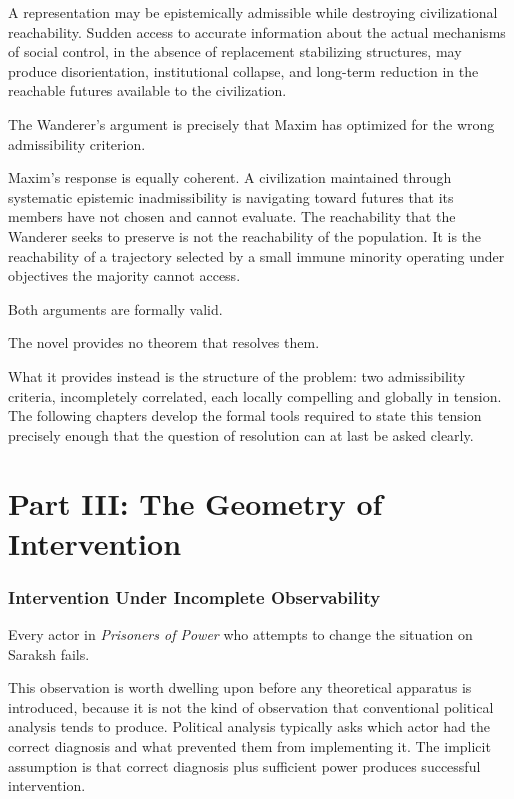\documentclass[12pt, a4paper]{article}
\theoremstyle{plain}
\theoremstyle{definition}
\theoremstyle{remark}
\begin{document}
A representation may be epistemically admissible
while destroying civilizational reachability.
Sudden access to accurate information about the
actual mechanisms of social control, in the absence
of replacement stabilizing structures, may produce
disorientation, institutional collapse, and
long-term reduction in the reachable futures
available to the civilization.

The Wanderer's argument is precisely that Maxim
has optimized for the wrong admissibility criterion.

Maxim's response is equally coherent. A civilization
maintained through systematic epistemic
inadmissibility is navigating toward futures that
its members have not chosen and cannot evaluate.
The reachability that the Wanderer seeks to preserve
is not the reachability of the population. It is
the reachability of a trajectory selected by a
small immune minority operating under objectives
the majority cannot access.

Both arguments are formally valid.

The novel provides no theorem that resolves them.

What it provides instead is the structure of the
problem: two admissibility criteria, incompletely
correlated, each locally compelling and globally
in tension. The following chapters develop the
formal tools required to state this tension
precisely enough that the question of resolution
can at last be asked clearly.

\newpage
\part*{Part III: The Geometry of Intervention}

\section{Intervention Under Incomplete Observability}

Every actor in \textit{Prisoners of Power} who
attempts to change the situation on Saraksh fails.

This observation is worth dwelling upon before
any theoretical apparatus is introduced, because
it is not the kind of observation that conventional
political analysis tends to produce. Political
analysis typically asks which actor had the correct
diagnosis and what prevented them from implementing
it. The implicit assumption is that correct
diagnosis plus sufficient power produces successful
intervention.
\end{document}
